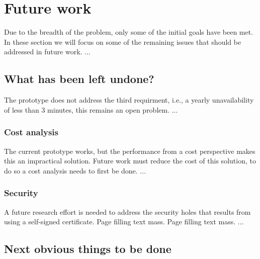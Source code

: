 \documentclass[english]{kththesis}
\begin{document}
\section{Future work}
\label{sec:futureWork}

Due to the breadth of the problem, only some of the initial goals have been
met. In these section we will focus on some of the remaining issues that
should be addressed in future work. ...

\subsection{What has been left undone?}
\label{what-has-been-left-undone}

The prototype does not address the third requirment, i.e., a yearly
unavailability of less than 3 minutes, this remains an open problem. ...

\subsubsection{Cost analysis}

The current prototype works, but the performance from a cost perspective makes
this an impractical solution. Future work must reduce the cost of this
solution, to do so a cost analysis needs to first be done. ...

\subsubsection{Security}

A future research effort is needed to address the security holes that results
from using a self-signed certificate. Page filling text mass. Page filling
text mass. ...


\subsection{Next obvious things to be done}
\end{document}
